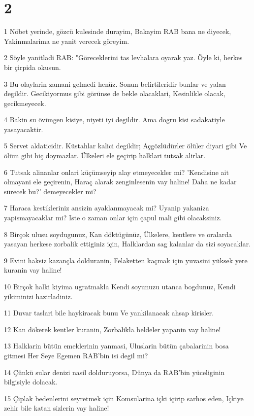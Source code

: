 \chapter{2}

\par 1 Nöbet yerinde, gözcü kulesinde durayim, Bakayim RAB bana ne diyecek, Yakinmalarima ne yanit verecek göreyim.
\par 2 Söyle yanitladi RAB: "Göreceklerini tas levhalara oyarak yaz. Öyle ki, herkes bir çirpida okusun.
\par 3 Bu olaylarin zamani gelmedi henüz. Sonun belirtileridir bunlar ve yalan degildir. Gecikiyormus gibi görünse de bekle olacaklari, Kesinlikle olacak, gecikmeyecek.
\par 4 Bakin su övüngen kisiye, niyeti iyi degildir. Ama dogru kisi sadakatiyle yasayacaktir.
\par 5 Servet aldaticidir. Küstahlar kalici degildir; Açgözlüdürler ölüler diyari gibi Ve ölüm gibi hiç doymazlar. Ülkeleri ele geçirip halklari tutsak alirlar.
\par 6 Tutsak alinanlar onlari küçümseyip alay etmeyecekler mi? 'Kendisine ait olmayani ele geçirenin, Haraç alarak zenginlesenin vay haline! Daha ne kadar sürecek bu?' demeyecekler mi?
\par 7 Haraca kestikleriniz ansizin ayaklanmayacak mi? Uyanip yakaniza yapismayacaklar mi? Iste o zaman onlar için çapul mali gibi olacaksiniz.
\par 8 Birçok ulusu soydugunuz, Kan döktügünüz, Ülkelere, kentlere ve oralarda yasayan herkese zorbalik ettiginiz için, Halklardan sag kalanlar da sizi soyacaklar.
\par 9 Evini haksiz kazançla dolduranin, Felaketten kaçmak için yuvasini yüksek yere kuranin vay haline!
\par 10 Birçok halki kiyima ugratmakla Kendi soyunuzu utanca bogdunuz, Kendi yikiminizi hazirladiniz.
\par 11 Duvar taslari bile haykiracak bunu Ve yankilanacak ahsap kirisler.
\par 12 Kan dökerek kentler kuranin, Zorbalikla beldeler yapanin vay haline!
\par 13 Halklarin bütün emeklerinin yanmasi, Uluslarin bütün çabalarinin bosa gitmesi Her Seye Egemen RAB'bin isi degil mi?
\par 14 Çünkü sular denizi nasil dolduruyorsa, Dünya da RAB'bin yüceliginin bilgisiyle dolacak.
\par 15 Çiplak bedenlerini seyretmek için Komsularina içki içirip sarhos eden, Içkiye zehir bile katan sizlerin vay haline!
